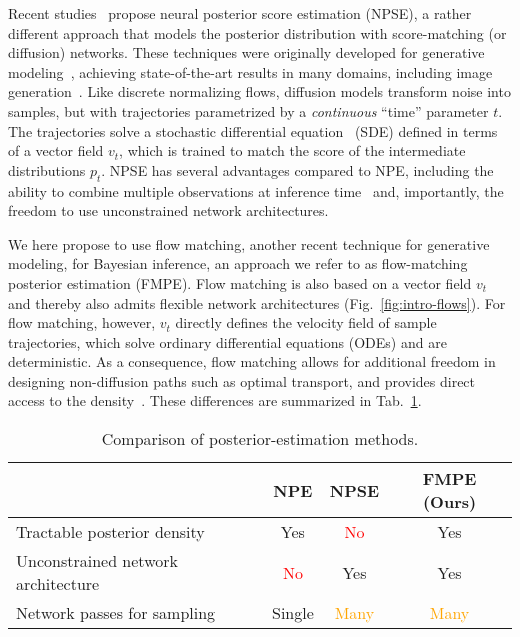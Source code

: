 \documentclass{article}
\theoremstyle{remark}
\begin{document}
Recent studies~\cite{sharrock2022sequential,geffner2022score} propose neural posterior score estimation (NPSE), a rather different approach that models the posterior distribution with score-matching (or diffusion) networks. These techniques were originally developed for generative modeling~\cite{sohl2015deep,song2019generative,ho2020denoising}, achieving state-of-the-art results in many domains, including image generation~\cite{NEURIPS2021_49ad23d1,ho2022cascaded}.  Like discrete normalizing flows, diffusion models transform noise into samples, but with trajectories parametrized by a \emph{continuous} ``time'' parameter $t$. The trajectories solve a stochastic differential equation~\cite{song2020score} (SDE) defined in terms of a vector field $v_t$, which is trained to match the score of the intermediate distributions $p_t$. NPSE has several advantages compared to NPE, including the ability to combine multiple observations at inference time~\cite{geffner2022score} and, importantly, the freedom to use unconstrained network architectures. 


We here propose to use flow matching, another recent technique for generative modeling, for Bayesian inference, an approach we refer to as flow-matching posterior estimation (FMPE). Flow matching is also based on a vector field $v_t$ and thereby also admits flexible network architectures (Fig.~\ref{fig:intro-flows}). For flow matching, however, $v_t$ directly defines the velocity field of sample trajectories, which solve ordinary differential equations (ODEs) and are deterministic. As a consequence, flow matching allows for additional freedom in designing non-diffusion paths such as optimal transport, and provides direct access to the density~\cite{flow_matching}. These differences are summarized in Tab.~\ref{tab:comparison}.

\begin{table}[h]
    \centering
    \caption{Comparison of posterior-estimation methods.}
    \label{tab:comparison}
    \begin{tabular}{@{}lccc@{}}
    \toprule
        & NPE & NPSE & \multicolumn{1}{c}{\textbf{FMPE (Ours)}} \\
    \midrule
    Tractable posterior density & \textcolor{yes}{Yes} & \textcolor{red}{No} & \textcolor{yes}{Yes} \\ 
    Unconstrained network architecture  & \textcolor{red}{No} & \textcolor{yes}{Yes} & \textcolor{yes}{Yes} \\
    Network passes for sampling & \textcolor{yes}{Single} & \textcolor{orange}{Many} & \textcolor{orange}{Many} \\ 
    
    \bottomrule
    \end{tabular}
\end{table}
\end{document}
